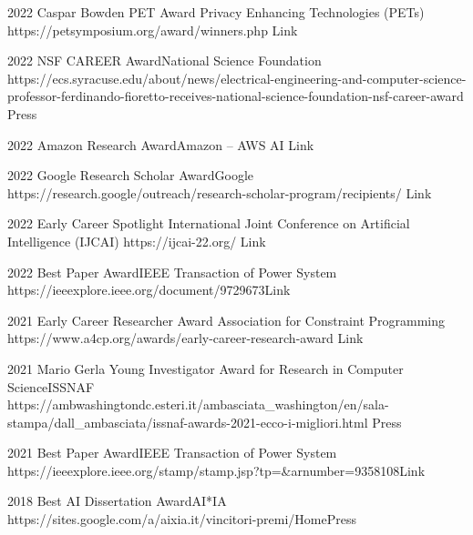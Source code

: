 \documentclass[localFont,alternative]{metadataShortBio}
\begin{document}
\begin{awards}
	\awardentry
	{2022}
	{Caspar Bowden PET Award}%
	{Privacy Enhancing Technologies (PETs)}
	{https://petsymposium.org/award/winners.php}
	{Link}

	\awardentry
	{2022}
	{NSF CAREER Award}{National Science Foundation}
	{https://ecs.syracuse.edu/about/news/electrical-engineering-and-computer-science-professor-ferdinando-fioretto-receives-national-science-foundation-nsf-career-award}
	{Press}

	\awardentry
	{2022}
	{Amazon Research Award}{Amazon -- AWS AI}
	{}
	{Link}

	\awardentry
	{2022}
	{Google Research Scholar Award}{Google}
	{https://research.google/outreach/research-scholar-program/recipients/}
	{Link}

	\awardentry
	{2022}
	{Early Career Spotlight}%
	{International Joint Conference on Artificial Intelligence (IJCAI)}
	{https://ijcai-22.org/}
	{Link}

	\awardentry
	{2022}
	{Best Paper Award}{IEEE Transaction of Power System}
	{https://ieeexplore.ieee.org/document/9729673}{Link}

	\awardentry
	{2021}
	{Early Career Researcher Award}
	{Association for Constraint Programming}
	{https://www.a4cp.org/awards/early-career-research-award}
	{Link}

	\awardentry
	{2021}
	{Mario Gerla Young Investigator Award for Research in Computer Science}{ISSNAF}
	{https://ambwashingtondc.esteri.it/ambasciata_washington/en/sala-stampa/dall_ambasciata/issnaf-awards-2021-ecco-i-migliori.html}
	{Press}

		
	\awardentry
	{2021}
	{Best Paper Award}{IEEE Transaction of Power System}
	{https://ieeexplore.ieee.org/stamp/stamp.jsp?tp=\&arnumber=9358108}{Link}

	\awardentry
	{2018}
	{Best AI Dissertation Award}{AI*IA} %
	{https://sites.google.com/a/aixia.it/vincitori-premi/Home}{Press}


\end{awards}	
\end{document}
